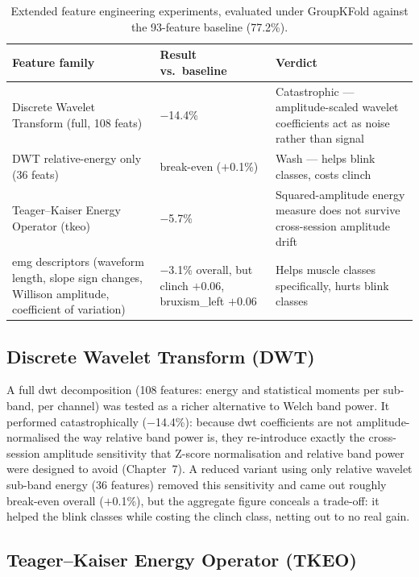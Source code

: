 \begin{table}[htbp]
\centering
\caption{Extended feature engineering experiments, evaluated
under GroupKFold against the 93-feature baseline (77.2\%).}
\label{tab:feature_experiments}
\renewcommand{\arraystretch}{1.3}
\begin{tabular}{p{3.3cm} p{3.0cm} p{6.0cm}}
\toprule
\textbf{Feature family} & \textbf{Result vs.\ baseline} &
\textbf{Verdict} \\
\midrule
Discrete Wavelet Transform (full, 108 feats) & $-$14.4\% &
Catastrophic --- amplitude-scaled wavelet coefficients act as
noise rather than signal \\
DWT relative-energy only (36 feats) & break-even ($+$0.1\%) &
Wash --- helps blink classes, costs clinch \\
Teager--Kaiser Energy Operator (\acrshort{tkeo}) & $-$5.7\% &
Squared-amplitude energy measure does not survive cross-session
amplitude drift \\
\acrshort{emg} descriptors (waveform length, slope sign
changes, Willison amplitude, coefficient of variation) &
$-$3.1\% overall, but clinch $+$0.06, bruxism\_left $+$0.06 &
Helps muscle classes specifically, hurts blink classes \\
\bottomrule
\end{tabular}
\end{table}

\subsection{Discrete Wavelet Transform (DWT)}

A full \acrshort{dwt} decomposition (108 features: energy and
statistical moments per sub-band, per channel) was tested as a
richer alternative to Welch band power. It performed
catastrophically ($-$14.4\%): because \acrshort{dwt}
coefficients are not amplitude-normalised the way relative band
power is, they re-introduce exactly the cross-session amplitude
sensitivity that Z-score normalisation and relative band power
were designed to avoid (Chapter~7). A reduced variant using
only relative wavelet sub-band energy (36 features) removed
this sensitivity and came out roughly break-even overall
($+$0.1\%), but the aggregate figure conceals a trade-off: it
helped the blink classes while costing the clinch class,
netting out to no real gain.

\subsection{Teager--Kaiser Energy Operator (TKEO)}

